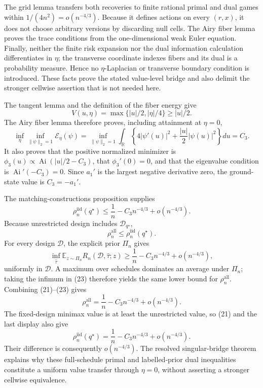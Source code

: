 The grid lemma transfers both recoveries to finite rational primal and dual games within \(1/(4n^2)=o(n^{-4/3})\).  Because it defines actions on every \((r,x)\), it does not choose arbitrary versions by discarding null cells.  The Airy fiber lemma proves the trace conditions from the one-dimensional weak Euler equation.  Finally, neither the finite risk expansion nor the dual information calculation differentiates in \(\eta\); the transverse coordinate indexes fibers and its dual is a probability measure.  Hence no \(\eta\)-Laplacian or transverse boundary condition is introduced.  These facts prove the stated value-level bridge and also delimit the stronger cellwise assertion that is not needed here.

The tangent lemma and the definition of the fiber energy give
\[
V(u,\eta)=\max\{|u|/2,|\eta|/4\}\geq |u|/2.
\]
The Airy fiber lemma therefore proves, including attainment at \(\eta=0\),
\[
\inf_{\eta}\inf_{\|\psi\|_2=1}\mathcal E_\eta(\psi)
=\inf_{\|\psi\|_2=1}
\int_{\mathbb R}\left\{4|\psi'(u)|^2+\frac{|u|}{2}|\psi(u)|^2\right\}du
=C_3.
\]
It also proves that the positive normalized minimizer is
\(\phi_3(u)\propto\operatorname{Ai}(|u|/2-C_3)\), that
\(\phi_3'(0)=0\), and that the eigenvalue condition is
\(\operatorname{Ai}'(-C_3)=0\).  Since \(a_1'\) is the largest negative derivative zero, the ground-state value is \(C_3=-a_1'\).

The matching-constructions proposition supplies
\[
\rho_n^{\mathrm{iid}}(q^\star)
\leq\frac1n-C_3n^{-4/3}+o(n^{-4/3}).
\tag{21}
\]
Because unrestricted design includes \(\mathcal D_{q^\star}\),
\[
\rho_n^{\mathrm{all}}\leq\rho_n^{\mathrm{iid}}(q^\star).
\tag{22}
\]
For every design \(\mathcal D\), the explicit prior \(\Pi_n\) gives
\[
\inf_{\widehat\tau}
\mathbb E_{z\sim\Pi_n}R_n(\mathcal D,\widehat\tau;z)
\geq\frac1n-C_3n^{-4/3}+o(n^{-4/3}),
\tag{23}
\]
uniformly in \(\mathcal D\).  A maximum over schedules dominates an average under \(\Pi_n\); taking the infimum in (23) therefore yields the same lower bound for \(\rho_n^{\mathrm{all}}\).  Combining (21)--(23) gives
\[
\rho_n^{\mathrm{all}}
=\frac1n-C_3n^{-4/3}+o(n^{-4/3}).
\]
The fixed-design minimax value is at least the unrestricted value, so (21) and the last display also give
\[
\rho_n^{\mathrm{iid}}(q^\star)
=\frac1n-C_3n^{-4/3}+o(n^{-4/3}).
\]
Their difference is consequently \(o(n^{-4/3})\).  The resolved singular-bridge theorem explains why these full-schedule primal and labelled-prior dual inequalities constitute a uniform value transfer through \(\eta=0\), without asserting a stronger cellwise equivalence.

